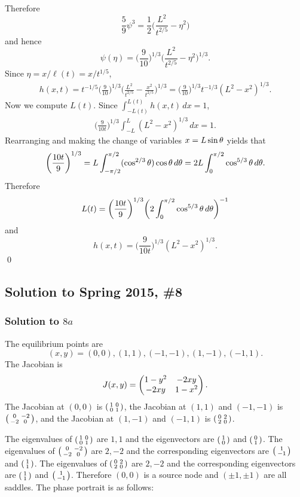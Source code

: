 Therefore
$$\frac{5}{9}\psi^{3} = \frac{1}{2}\bigg(\frac{L^{2}}{t^{2/5}} - \eta^{2}\bigg)$$
and hence
$$\psi(\eta) = \bigg(\frac{9}{10}\bigg)^{1/3}\bigg(\frac{L^{2}}{t^{2/5}} - \eta^{2}\bigg)^{1/3}.$$
Since $\eta = x/\ell(t) = x/t^{1/5}$,
\begin{align*}
h(x, t) = t^{-1/5}\bigg(\frac{9}{10}\bigg)^{1/3}\bigg(\frac{L^{2}}{t^{2/5}} - \frac{x^{2}}{t^{2/5}}\bigg)^{1/3} = \bigg(\frac{9}{10}\bigg)^{1/3}t^{-1/3}(L^{2} - x^{2})^{1/3}.
\end{align*}
Now we compute $L(t)$. Since $\int_{-L(t)}^{L(t)}h(x, t)\, dx = 1$,
\begin{align*}
\bigg(\frac{9}{10t}\bigg)^{1/3}\int_{-L}^{L}(L^{2} - x^{2})^{1/3}\, dx = 1.
\end{align*}
Rearranging and making the change of variables $x = L\sin\theta$ yields that
\begin{align*}
\bigg(\frac{10t}{9}\bigg)^{1/3} = L\int_{-\pi/2}^{\pi/2}(\cos^{2/3}\theta)\cos \theta\, d\theta = 2L\int_{0}^{\pi/2}\cos^{5/3}\theta\, d\theta.
\end{align*}
Therefore
$$L(t) = \bigg(\frac{10t}{9}\bigg)^{1/3}\bigg(2\int_{0}^{\pi/2}\cos^{5/3}\theta\, d\theta\bigg)^{-1}$$
and
$$h(x, t) = \bigg(\frac{9}{10t}\bigg)^{1/3}(L^{2} - x^{2})^{1/3}.$$
\hfill\qed

\subsection*{Solution to Spring 2015, \#8}\label{s158}
\subsubsection*{Solution to $8a$}
The equilibrium points are
$$(x, y) = (0, 0), (1, 1), (-1, -1), (1, -1), (-1, 1).$$
The Jacobian is
$$J(x, y) = \begin{pmatrix} 1 - y^{2} & -2xy \\ -2xy & 1 - x^{2}\end{pmatrix}.$$
The Jacobian at $(0, 0)$ is $\left(\begin{smallmatrix} 1 & 0 \\ 0 & 1\end{smallmatrix}\right)$, the Jacobian at $(1, 1)$ and $(-1, -1)$
is $\left(\begin{smallmatrix} 0 & -2 \\ -2 & 0\end{smallmatrix}\right)$, and the Jacobian at $(1, -1)$ and $(-1, 1)$ is $\left(\begin{smallmatrix} 0 & 2 \\ 2 & 0\end{smallmatrix}\right)$.

The eigenvalues of $\left(\begin{smallmatrix} 1 & 0 \\ 0 & 1\end{smallmatrix}\right)$ are $1, 1$ and the eigenvectors are $\left(\begin{smallmatrix} 1 \\ 0\end{smallmatrix}\right)$ and $\left(\begin{smallmatrix} 0 \\ 1\end{smallmatrix}\right)$.
The eigenvalues of $\left(\begin{smallmatrix} 0 & -2 \\ -2 & 0\end{smallmatrix}\right)$ are $2, -2$ and the corresponding eigenvectors are $\left(\begin{smallmatrix} 1 \\ -1\end{smallmatrix}\right)$ and
$\left(\begin{smallmatrix} 1 \\ 1\end{smallmatrix}\right)$. The eigenvalues of $\left(\begin{smallmatrix} 0 & 2 \\ 2 & 0\end{smallmatrix}\right)$ are $2, -2$ and the corresponding eigenvectors are $\left(\begin{smallmatrix} 1 \\ 1\end{smallmatrix}\right)$ and $\left(\begin{smallmatrix} 1 \\ -1\end{smallmatrix}\right)$.
Therefore $(0, 0)$ is a source node and $(\pm 1, \pm 1)$ are all saddles.
The phase portrait is as follows:

